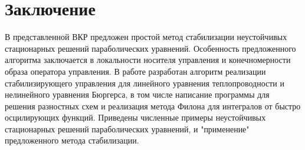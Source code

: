 \section*{Заключение}

\vspace{2em}

В представленной ВКР предложен простой метод стабилизации неустойчивых
стационарных решений параболических уравнений. Особенность предложенного
алгоритма заключается в локальности носителя управления и конечномерности образа
оператора управления. В работе разработан алгоритм реализации стабилизирующего
управления для линейного уравнения теплопроводности и нелинейного уравнения
Бюргерса, в том числе написание программы для решения разностных схем и
реализация метода Филона для интегралов от быстро осцилирующих функций.
Приведены численные примеры неустойчивых стационарных решений параболических
уравнений, и "применение" предложенного метода стабилизации.
